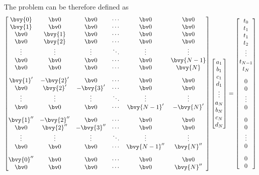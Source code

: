 The problem can be therefore defined as
\begin{subequations}
	\begin{gather}
		\begin{bmatrix}
			\bvy{0} 	& \bv0 		& \bv0 		& \cdots & \bv0 		 & \bv0 		\\
			\bvy{1} 	& \bv0 		& \bv0 		& \cdots & \bv0 		 & \bv0 		\\
			\bv0 		& \bvy{1} 	& \bv0 		& \cdots & \bv0 		 & \bv0 		\\
			\bv0 		& \bvy{2} 	& \bv0 		& \cdots & \bv0 		 & \bv0 		\\
			\vdots 	& \vdots 	& \vdots 	& \ddots & \vdots 	 & \vdots 	\\
			\bv0 		& \bv0 		& \bv0 		& \cdots & \bv0		 & \bvy{N-1}\\
			\bv0 		& \bv0 		& \bv0 		& \cdots & \bv0 		 & \bvy{N}	\\[0.3cm]
			\bvy{1}' & -\bvy{2}' & \bv0 		& \cdots & \bv0 		 & \bv0		\\
			\bv0 		& \bvy{2}' 	& -\bvy{3}' & \cdots & \bv0 		 & \bv0 		\\
			\vdots 	& \vdots 	& \vdots 	& \ddots & \vdots 	 & \vdots 	\\
			\bv0 		& \bv0 		& \bv0 		& \cdots & \bvy{N-1}' & -\bvy{N}'\\[0.3cm]
			\bvy{1}''& -\bvy{2}''& \bv0 		& \cdots & \bv0 		 & \bv0		\\
			\bv0 		& \bvy{2}''	& -\bvy{3}''& \cdots & \bv0 		 & \bv0 		\\
			\vdots 	& \vdots 	& \vdots 	& \ddots & \vdots 	 & \vdots 	\\
			\bv0 		& \bv0 		& \bv0 		& \cdots & \bvy{N-1}''& \bvy{N}''\\[0.3cm]
			\bvy{0}''& \bv0		& \bv0 		& \cdots & \bv0		 & \bv0 		\\
			\bv0 		& \bv0		& \bv0 		& \cdots	& \bv0		 & \bvy{N}''
		\end{bmatrix}
		\begin{bmatrix}
			a_1 \\ b_1 \\ c_1 \\ d_1 \\ \vdots \\ a_N \\ b_N \\ c_N \\ d_N
		\end{bmatrix}
		=
		\begin{bmatrix}
			t_0 \\ t_1 \\ t_1 \\ t_2 \\ \vdots \\ t_{N-1} \\ t_{N} \\[0.3cm] 0 \\ 0 \\ \vdots \\ 0 \\[0.3cm] 0 \\ 0 \\ \vdots \\ 0 \\[0.3cm] 0 \\ 0

\end{bmatrix}
\end{gather}
\end{subequations}
